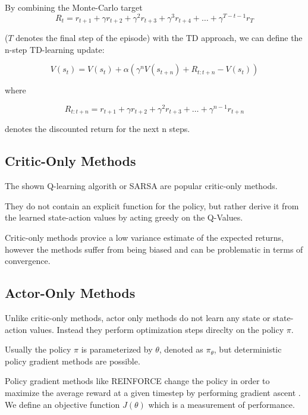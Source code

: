 By combining the Monte-Carlo target
\begin{equation}
R_t = r_{t+1}+\gamma r_{t+2}+\gamma^2 r_{t+3}+\gamma^3 r_{t+4}+ \dots +\gamma^{T-t-1} r_{T}
\end{equation}

 ($T$ denotes the final step of the episode) with the TD approach, we can define the n-step TD-learning update:
 
\begin{equation}
V(s_t) = V(s_t) + \alpha(\gamma^nV(s_{t+n})+R_{t:t+n} - V(s_t))
\end{equation} 

where 

\begin{equation}
R_{t:t+n} = r_{t+1}+\gamma r_{t+2}+\gamma^2 r_{t+3}+ \dots +\gamma^{n-1} r_{t+n}
\end{equation}

denotes the discounted return for the next n steps.
\subsection{Critic-Only Methods}

The shown Q-learning algorith or SARSA are popular critic-only methods.

They do not contain an explicit function for the policy, but rather derive it from the learned state-action values by acting greedy on the Q-Values.

Critic-only methods provice a low variance estimate of the expected returns, however the methods suffer from being biased and can be problematic in terms of convergence.

\subsection{Actor-Only Methods}

Unlike critic-only methods, actor only methods do not learn any state or state-action values.
Instead they perform optimization steps direclty on the policy $\pi$.

Usually the policy $\pi$ is parameterized by $\theta$, denoted as $\pi_\theta$, but deterministic policy gradient methods are possible\citep{DDPG}. 

Policy gradient methods like REINFORCE change the policy in order to maximize the average reward at a given timestep by performing gradient ascent \citep{Williams1992}. 
We define an objective function $J(\theta)$ which is a measurement of performance.

